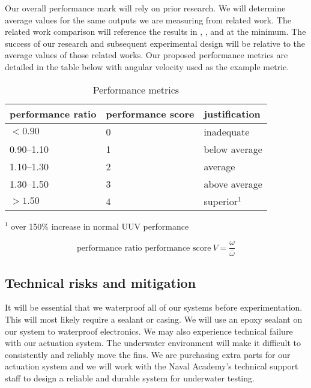 \documentclass{IEEEtran}
\begin{document}
Our overall performance mark will rely on prior research. We will determine average values for the same outputs we are measuring from related work. The related work comparison will reference the results in \cite{berenice2018splash}, \cite{orourke2020navy}, and \cite{hiller2012expanding} at the minimum. The success of our research and subsequent experimental design will be relative to the average values of those related works. Our proposed performance metrics are detailed in the table below with angular velocity used as the example metric.
\begin{table}
\caption{Performance metrics}
\label{tab:2}
\begin{center}
\begin{tabular}{lll}
\toprule
performance ratio & performance score & justification \\
\midrule 
$< \num{0.90}$ & 0 & inadequate \\
\numrange{0.90}{1.10} & 1 & below average \\
\numrange{1.10}{1.30} & 2 & average \\
\numrange{1.30}{1.50} & 3 & above average \\
$> \num{1.50}$ & 4 & superior$^1$\\
\bottomrule
\end{tabular}

\vspace{1em}
$^1$ over 150\% increase in normal UUV performance
\end{center}
\end{table}
\begin{equation}
\mbox{performance ratio performance score}\ V = \frac{\omega}{\bar{\omega}}
\label{eq:performance-ratio}
\end{equation}

\subsection{Technical risks and mitigation}
It will be essential that we waterproof all of our systems before experimentation. This will most likely require a sealant or casing. We will use an epoxy sealant on our system to waterproof electronics. We may also experience technical failure with our actuation system. The underwater environment will make it difficult to consistently and reliably move the fins. We are purchasing extra parts for our actuation system and we will work with the Naval Academy’s technical support staff to design a reliable and durable system for underwater testing.
\end{document}
